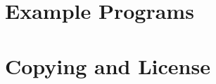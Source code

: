 \documentclass[10pt,fleqn]{article}
\newcommand{\CL}{\textsf{Common~Lisp}}
\begin{document}
  
  



\appendix

\section{Example Programs}


\section{Copying and License}


\printindex
\end{document}

